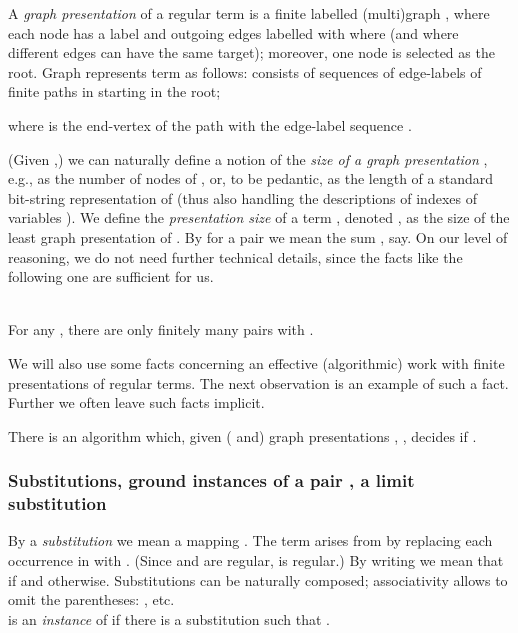 \documentclass[12pt]{article}
\begin{document}
\begin{defn}
A \emph{graph presentation} of a regular term is 
a finite labelled (multi)graph , where each node  has a label
 and   outgoing edges
labelled with  where  
(and where different edges can have the same target); 
moreover, one node is selected  as the root. 
Graph  represents term  as follows:  
consists of sequences of edge-labels of
finite paths in   starting in the root; 

where  is the end-vertex of the path with the edge-label sequence
.
\end{defn}
(Given ,) 
we can naturally define a notion of the \emph{size of a graph
presentation} , e.g., as the number of nodes of , or, to be
pedantic, as the length of a standard bit-string representation of 
(thus also handling the descriptions of indexes of variables ).
We define the
\emph{presentation size} of a term , denoted 
, as the size of the least graph
presentation of . 
By  for a pair  we mean the sum 
, say. 
On our level of reasoning, we do not need further technical details,
since the facts like the following one are sufficient for us.

\begin{observ}\label{prop:boundpressize}\hfill
\\
For any , there are only finitely many pairs  with
.
\end{observ}
We will also use some facts concerning an effective (algorithmic)
work with finite
presentations of regular terms. The next observation is an example of
such a fact. Further we often leave such facts implicit.

\begin{observ}\label{prop:algorgraphequality}
There is an algorithm which, given ( and) 
graph presentations , , decides if .
\end{observ}


\subsubsection*{Substitutions, 
ground instances of a pair
, a limit substitution}

By a \emph{substitution}
we mean a mapping .
The term  arises from  by 
replacing each occurrence  in  with .
(Since  and  are regular,  is regular.)
By writing 
we mean that  if  and 
 otherwise. Substitutions can be naturally composed;
associativity allows to omit the parentheses:
, etc.
\\
 is an \emph{instance} of  if there is 
a substitution  such that . 
\end{document}
